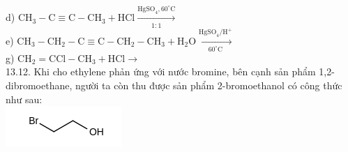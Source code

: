 \documentclass[10pt]{article}
\begin{document}
d) $\mathrm{CH}_{3}-\mathrm{C} \equiv \mathrm{C}-\mathrm{CH}_{3}+\mathrm{HCl} \xrightarrow[1: 1]{\mathrm{HgSO}_{4}, 60^{\circ} \mathrm{C}}$\\
e) $\mathrm{CH}_{3}-\mathrm{CH}_{2}-\mathrm{C} \equiv \mathrm{C}-\mathrm{CH}_{2}-\mathrm{CH}_{3}+\mathrm{H}_{2} \mathrm{O} \xrightarrow[60^{\circ} \mathrm{C}]{\mathrm{HgSO}_{4} / \mathrm{H}^{+}}$\\
g) $\mathrm{CH}_{2}=\mathrm{CCl}-\mathrm{CH}_{3}+\mathrm{HCl} \longrightarrow$\\
13.12. Khi cho ethylene phản ứng với nước bromine, bên cạnh sản phẩm 1,2-dibromoethane, người ta còn thu được sản phẩm 2-bromoethanol có công thức như sau:\\
\includegraphics{smile-ae878e05b4e21fadc5ffd44c28d2f91d89a751ab}
\end{document}
